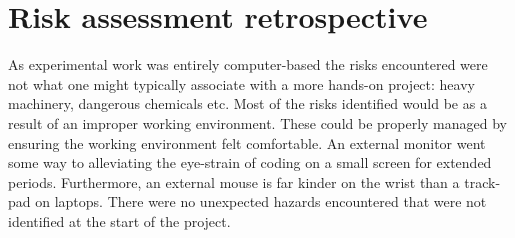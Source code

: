 \section{Risk assessment retrospective}

As experimental work was entirely computer-based the risks encountered were not what one might typically associate with a more hands-on project: heavy machinery, dangerous chemicals etc. Most of the risks identified would be as a result of an improper working environment. These could be properly managed by ensuring the working environment felt comfortable. An external monitor went some way to alleviating the eye-strain of coding on a small screen for extended periods. Furthermore, an external mouse is far kinder on the wrist than a track-pad on laptops. There were no unexpected hazards encountered that were not identified at the start of the project.